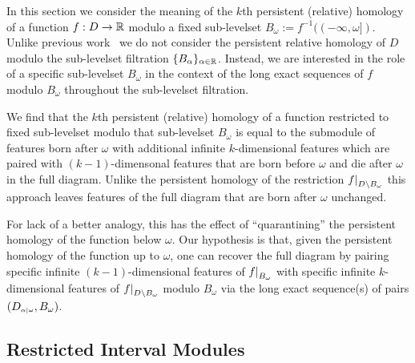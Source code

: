 
In this section we consider the meaning of the $k$th persistent (relative) homology of a function $f : D\to \mathbb{R}$ modulo a fixed sub-levelset $B_\omega := f^{-1}((-\infty,\omega])$.
Unlike previous work~\cite{extendedpersistence} we do not consider the persistent relative homology of $D$ modulo the sub-levelset filtration $\{B_\alpha\}_{\alpha\in\mathbb{R}}$.
Instead, we are interested in the role of a specific sub-levelset $B_\omega$ in the context of the long exact sequences of $f$ modulo $B_\omega$ throughout the sub-levelset filtration.

We find that the $k$th persistent (relative) homology of a function restricted to fixed sub-levelset modulo that sub-levelset $B_\omega$ is equal to the submodule of features born after $\omega$ with additional infinite $k$-dimensional features which are paired with $(k-1)$-dimensonal features that are born before $\omega$ and die after $\omega$ in the full diagram.
Unlike the persistent homology of the restriction $f\mathord{\mid}_{D\setminus B_\omega}$ this approach leaves features of the full diagram that are born after $\omega$ unchanged.

For lack of a better analogy, this has the effect of ``quarantining'' the persistent homology of the function below $\omega$.
Our hypothesis is that, given the persistent homology of the function up to $\omega$, one can recover the full diagram by pairing specific infinite $(k-1)$-dimensional features of $f\mathord{\mid}_{B_\omega}$ with specific infinite $k$-dimensional features of $f\mathord{\mid}_{D\setminus B_\omega}$ modulo $B_\omega$ via the long exact sequence(s) of pairs $(D_{\scriptscriptstyle \alpha\mid \omega}, B_\omega)$.

\subsection{Restricted Interval Modules}

